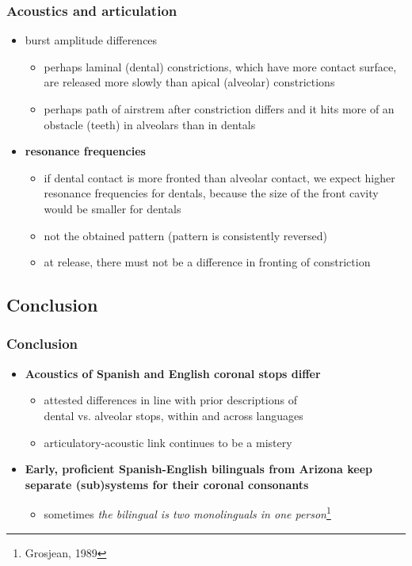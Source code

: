 \documentclass{beamer}
\begin{document}
\begin{frame}
\frametitle{Acoustics and articulation}
\begin{itemize}
	\item burst amplitude differences
	\begin{itemize}
		\item perhaps laminal (dental) constrictions, which have more contact surface, are released more slowly than apical (alveolar) constrictions
		\item perhaps path of airstrem after constriction differs and it hits more of an obstacle (teeth) in alveolars than in dentals
	\end{itemize}
	\item \textbf{resonance frequencies}
	\begin{itemize}
		\item if dental contact is more fronted than alveolar contact, we expect higher resonance frequencies for dentals, because the size of the front cavity would be smaller for dentals
		\item not the obtained pattern (pattern is consistently reversed)
		\item at release, there must not be a difference in fronting of constriction
	\end{itemize}
\end{itemize}
\end{frame}

\subsection{Conclusion}

\begin{frame}
\frametitle{Conclusion}
\begin{itemize}
	\item \textbf{Acoustics of Spanish and English coronal stops differ}
	\begin{itemize}
		\item attested differences in line with prior descriptions of \\ dental vs. alveolar stops, within and across languages
		\item articulatory-acoustic link continues to be a mistery
	\end{itemize}
	\item \textbf{Early, proficient Spanish-English bilinguals from Arizona keep separate (sub)systems for their coronal consonants}
	\begin{itemize}
		\item sometimes \emph{the bilingual is two monolinguals in one person}\footnote{Grosjean, 1989}
	\end{itemize}
\end{itemize}
\end{frame}
\end{document}
